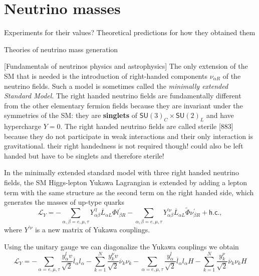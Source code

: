 \section{Neutrino masses}
Experiments for their values? Theoretical predictions for how they obtained them

Theories of neutrino mass generation

[Fundamentals of neutrinos physics and astrophysics]
The only extension of the SM that is needed is the introduction of right-handed components $\nu_{\alpha R}$ of the neutrino fields. Such a model is sometimes called the \textit{minimally extended Standard Model}. The right handed neutrino fields are fundamentally different from the other elementary fermion fields because they are invariant under the symmetries of the SM: they are \textbf{singlets} of $\textsf{SU}(3)_C\times\textsf{SU}(2)_L$ and have hypercharge $Y=0$. The right handed neutrino fields are called sterile [883] because they do not participate in weak interactions and their only interaction is gravitational. their right handedness is not required though! could also be left handed but have to be singlets and therefore sterile!

In the minimally extended standard model with three right handed neutrino fields, the SM Higgs-lepton Yukawa Lagrangian is extended by adding a lepton term with the same structure as the second term on the right handed side, which generates the masses of up-type quarks
\begin{equation}
\mathcal{L}_Y=
-\sum_{\alpha,\beta=e,\mu,\tau} Y_{\alpha\beta}^{\prime l} \overline{L}_{\alpha L}\Phi l_{\beta R}^{\prime}
-\sum_{\alpha,\beta=e,\mu,\tau} Y_{\alpha\beta}^{\prime \nu} \overline{L}_{\alpha L}\tilde{\Phi} \nu_{\beta R}^{\prime}
+\textsf{h.c.},
\end{equation}
where $Y^{\prime \nu}$ is a new matrix of Yukawa couplings.

Using the unitary gauge we can diagonalize the Yukawa couplings we obtain
\begin{equation}
\mathcal{L}_Y=
-\sum_{\alpha=e,\mu,\tau}\frac{y_\alpha^l v}{\sqrt{2}}\overline{l}_\alpha l_\alpha
-\sum_{k=1}^N \frac{y_k^\nu v}{\sqrt{2}}\overline{\nu}_k\nu_k
-\sum_{\alpha=e,\mu,\tau}\frac{y_\alpha^l}{\sqrt{2}}\overline{l}_\alpha l_\alpha H
-\sum_{k=1}^N \frac{y_k^\nu}{\sqrt{2}}\overline{\nu}_k\nu_k H
\end{equation}

